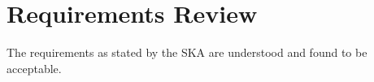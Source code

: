 \section{Requirements Review}
The requirements as stated by the SKA are understood and found to be acceptable. 

